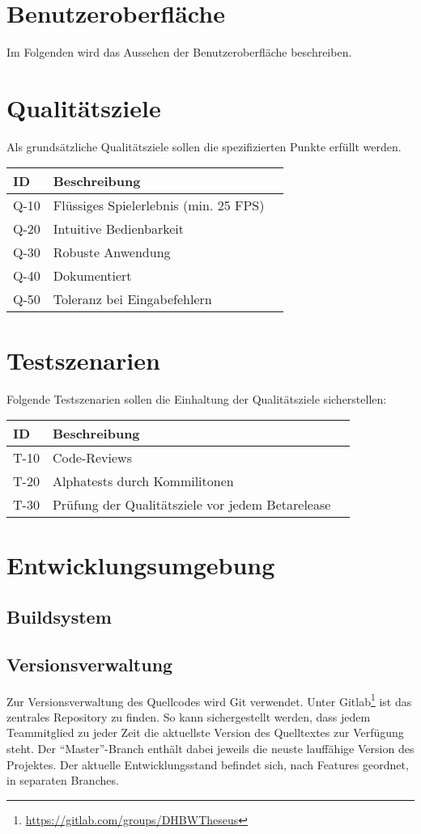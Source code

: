 \chapter{Benutzeroberfläche}
Im Folgenden wird das Aussehen der Benutzeroberfläche beschreiben.


\chapter{Qualitätsziele}
Als grundsätzliche Qualitätsziele sollen die spezifizierten Punkte erfüllt werden.

\begin{tabularx}{\textwidth}{|l|X|l|}
\toprule
\textbf{ID} & \textbf{Beschreibung}\\
\endhead
\hline
Q-10 & Flüssiges Spielerlebnis (min. 25 FPS)  \\
Q-20 & Intuitive Bedienbarkeit  \\
Q-30 & Robuste Anwendung  \\
Q-40 & Dokumentiert  \\  
Q-50 & Toleranz bei Eingabefehlern \\
\hline
\end{tabularx}


\chapter{Testszenarien}
Folgende Testszenarien sollen die Einhaltung der Qualitätsziele sicherstellen:
\begin{tabularx}{\textwidth}{|l|X|l|}
\toprule
\textbf{ID} & \textbf{Beschreibung}\\
\endhead
\hline
T-10 & Code-Reviews  \\
T-20 & Alphatests durch Kommilitonen  \\
T-30 & Prüfung der Qualitätsziele vor jedem Betarelease  \\
\hline
\end{tabularx}


\chapter{Entwicklungsumgebung}


\section{Buildsystem}

\section{Versionsverwaltung}
Zur Versionsverwaltung des Quellcodes wird Git verwendet. Unter Gitlab\footnote{\url{https://gitlab.com/groups/DHBWTheseus}} ist das zentrales Repository zu finden. So kann sichergestellt werden, dass jedem Teammitglied zu jeder Zeit die aktuellste Version des Quelltextes zur Verfügung steht. Der \enquote{Master}-Branch enthält dabei jeweils die neuste lauffähige Version des Projektes. Der aktuelle Entwicklungsstand befindet sich, nach Features geordnet, in separaten Branches.



